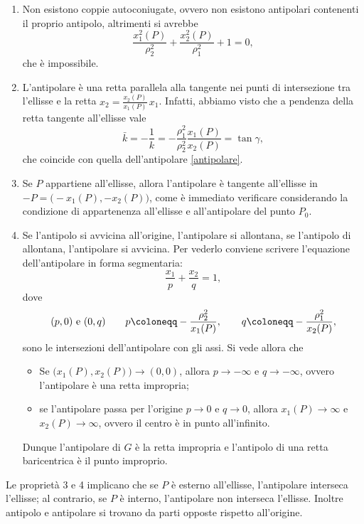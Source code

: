 \begin{enumerate}
	\item Non esistono coppie autoconiugate, ovvero non esistono antipolari contenenti il proprio antipolo, altrimenti si avrebbe
		\begin{equation}
			\frac{x^2_1(P)}{\rho_2^2}+ \frac{x^2_2(P)}{\rho_1^2}+1=0,
		\end{equation}
	che è impossibile.
\item L'antipolare è una retta parallela alla tangente nei punti di intersezione tra l'ellisse e la retta $x_2=\frac{x_2(P)}{x_1(P)}\,x_1$.
Infatti, abbiamo visto che a pendenza della retta tangente all'ellisse vale
\begin{equation}
	\bar{k}=-\frac 1k=-\frac{\rho_1^2}{\rho_2^2}\frac{x_1(P)}{x_2(P)}=\tan \gamma,
\end{equation}
che coincide con quella dell'antipolare  \eqref{antipolare}.
\item Se $P$ appartiene all'ellisse, allora l'antipolare è tangente all'ellisse in $-P=\big(-x_1(P),-x_2(P) \big)$, come è immediato verificare considerando la condizione di appartenenza all'ellisse e all'antipolare del punto $P_0$.
\item Se l'antipolo si avvicina all'origine, l'antipolare si allontana, se l'antipolo di allontana, l'antipolare si avvicina. Per vederlo conviene scrivere l'equazione dell'antipolare in forma segmentaria:
\begin{equation}
\frac{x_1}{p}+\frac{x_2}{q}=1,
\end{equation}
dove
\begin{equation}
(p, 0) \,\, {\rm e}\,\, (0,q)   \qquad p\coloneqq -\frac{\rho_2^2}{x_1(P)}, \qquad q\coloneqq -\frac{\rho_1^2}{x_2(P)}, 
\end{equation}
sono le intersezioni dell'antipolare con gli assi. Si vede allora che
\begin{itemize}
	\item Se $\big(x_1(P), x_2(P)\big)\to(0,0)$, allora $p\to-\infty$ e $q\to-\infty$, ovvero l'antipolare è una retta impropria;
	\item se l'antipolare passa per l'origine $p\to 0$ e $q\to 0$, allora $x_1(P)\to \infty$ e $x_2(P)\to \infty$, ovvero il centro è in punto all'infinito. 
\end{itemize}
Dunque l'antipolare di $G$ è la retta impropria e l'antipolo di una retta baricentrica è il punto improprio.
\end{enumerate}

Le proprietà 3 e 4 implicano che se $P$ è esterno all'ellisse, l'antipolare interseca l'ellisse; al contrario, se $P$ è interno, l'antipolare non interseca l'ellisse. Inoltre antipolo e antipolare si trovano da parti opposte rispetto all'origine.

